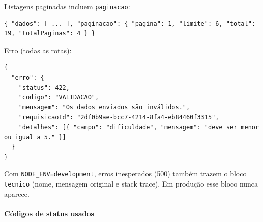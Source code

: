 Listagens paginadas incluem \texttt{paginacao}:

\begin{Verbatim}[breaklines,breakanywhere,fontsize=\scriptsize]
{ "dados": [ ... ], "paginacao": { "pagina": 1, "limite": 6, "total": 19, "totalPaginas": 4 } }
\end{Verbatim}

Erro (todas as rotas):

\begin{Verbatim}[breaklines,breakanywhere,fontsize=\scriptsize]
{
  "erro": {
    "status": 422,
    "codigo": "VALIDACAO",
    "mensagem": "Os dados enviados são inválidos.",
    "requisicaoId": "2df0b9ae-bcc7-4214-8fa4-eb84460f3315",
    "detalhes": [{ "campo": "dificuldade", "mensagem": "deve ser menor ou igual a 5." }]
  }
}
\end{Verbatim}

Com \texttt{NODE\_ENV=development}, erros inesperados (500) também
trazem o bloco \texttt{tecnico} (nome, mensagem original e stack trace).
Em produção esse bloco nunca aparece.

\hypertarget{cuxf3digos-de-status-usados}{%
\paragraph{Códigos de status usados}\label{cuxf3digos-de-status-usados}}

